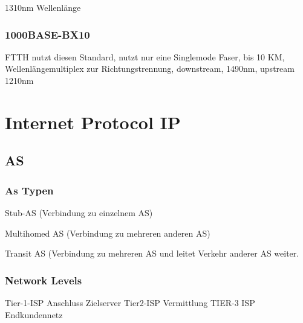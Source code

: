 \begin{multicols}{2}
	1310nm Wellenlänge

\subsubsection{1000BASE-BX10}

FTTH nutzt diesen Standard, nutzt nur eine Singlemode Faser, bis 10 KM, Wellenlängemultiplex zur Richtungstrennung, downstream, 1490nm, upstream 1210nm
 
 
 \section{Internet Protocol IP}
 
 \subsection{AS}

 \subsubsection{As Typen}
 \begin{itemize}
	 Stub-AS
	 (Verbindung zu einzelnem AS)
	 
	 Multihomed AS (Verbindung zu mehreren anderen AS)
	 
	 
	 Transit AS (Verbindung zu mehreren AS und leitet Verkehr anderer AS weiter.	
 \end{itemize}
 
 \subsubsection{Network Levels}
 Tier-1-ISP Anschluss Zielserver
 Tier2-ISP Vermittlung
 TIER-3 ISP Endkundennetz
 
\end{multicols}


